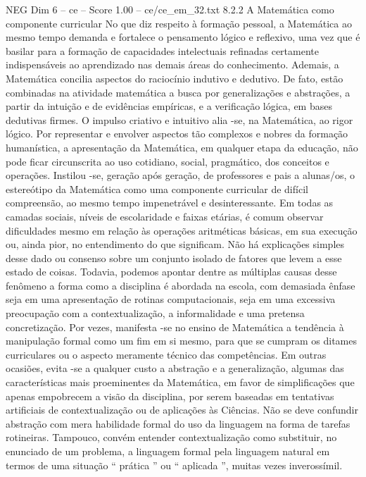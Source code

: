 \begin{textsample}{NEG Dim 6 – ce – Score 1.00 – ce/ce\_em\_32.txt}  \label{ex:f6_neg_252}
8.2.2 A Matemática como componente curricular No que diz respeito à formação pessoal, a Matemática ao mesmo tempo demanda e fortalece o pensamento lógico e reflexivo, uma vez que é basilar para a formação de capacidades intelectuais refinadas certamente indispensáveis ao aprendizado nas demais áreas do conhecimento.
Ademais, a Matemática concilia aspectos do raciocínio indutivo e dedutivo.
De fato, estão combinadas na atividade matemática a busca por generalizações e abstrações, a partir da intuição e de evidências empíricas, e a verificação lógica, em bases dedutivas firmes.
O impulso criativo e intuitivo alia -se, na Matemática, ao rigor lógico.
Por representar e envolver aspectos tão complexos e nobres da formação humanística, a apresentação da Matemática, em qualquer etapa da educação, não pode ficar circunscrita ao uso cotidiano, social, pragmático, dos conceitos e operações.
Instilou -se, geração após geração, de professores e pais a alunas/os, o estereótipo da Matemática como uma componente curricular de difícil compreensão, ao mesmo tempo impenetrável e desinteressante.
Em todas as camadas sociais, níveis de escolaridade e faixas etárias, é comum observar dificuldades mesmo em relação às operações aritméticas básicas, em sua execução ou, ainda pior, no entendimento do que significam.
Não há explicações simples desse dado ou consenso sobre um conjunto isolado de fatores que levem a esse estado de coisas.
Todavia, podemos apontar dentre as múltiplas causas desse fenômeno a forma como a disciplina é abordada na escola, com demasiada ênfase seja em uma apresentação de rotinas computacionais, seja em uma excessiva preocupação com a contextualização, a informalidade e uma pretensa concretização.
Por vezes, manifesta -se no ensino de Matemática a tendência à manipulação formal como um fim em si mesmo, para que se cumpram os ditames curriculares ou o aspecto meramente técnico das competências.
Em outras ocasiões, evita -se a qualquer custo a abstração e a generalização, algumas das características mais proeminentes da Matemática, em favor de simplificações que apenas empobrecem a visão da disciplina, por serem baseadas em tentativas artificiais de contextualização ou de aplicações às Ciências.
Não se deve confundir abstração com mera habilidade formal do uso da linguagem na forma de tarefas rotineiras.
Tampouco, convém entender contextualização como substituir, no enunciado de um problema, a linguagem formal pela linguagem natural em termos de uma situação “ prática ” ou “ aplicada ”, muitas vezes inverossímil.

\end{textsample}
